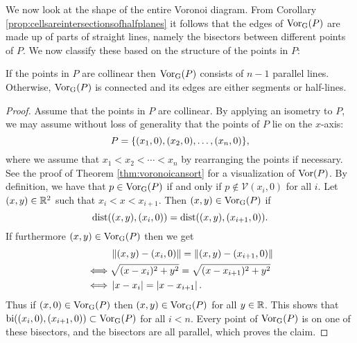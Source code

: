We now look at the shape of the entire Voronoi diagram. From Corollary \ref{prop:cellsareintersectionsofhalfplanes} it follows that the edges of $\operatorname{Vor_{G}}(P)$ are made up of parts of straight lines, namely the bisectors between different points of $P$. We now classify these based on the structure of the points in $P$:
\begin{thm} \label{prop:structureofentirevoronoidiagram}
If the points in $P$ are collinear then $\operatorname{Vor_{G}}(P)$ consists of $n - 1$ parallel lines. Otherwise, $\operatorname{Vor_{G}}(P)$ is connected and its edges are either segments or half-lines.
\end{thm}
\begin{proof}
Assume that the points in $P$ are collinear. By applying an isometry to $P$, we may assume without loss of generality that the points of $P$ lie on the $x$-axis:
\[
    P = \{(x_1, 0), (x_2, 0), \ldots, (x_n, 0)\},
\]
where we assume that $x_1 < x_2 < \cdots < x_n$ by rearranging the points if necessary. See the proof of Theorem \ref{thm:voronoicansort} for a visualization of $\operatorname{Vor}(P)$. By definition, we have that $p \in \operatorname{Vor_{G}}(P)$ if and only if $p \not\in \mathcal{V}(x_i, 0)$ for all $i$. Let $(x, y) \in \mathbb{R}^2$ such that $x_i < x < x_{i+1}$. Then $(x, y) \in \operatorname{Vor_{G}}(P)$ if
\[
    \operatorname{dist}((x, y), (x_i, 0)) = \operatorname{dist}((x, y), (x_{i+1}, 0)).
\]
If furthermore $(x, y) \in \operatorname{Vor_{G}}(P)$ then we get
\begin{align*}
    &\left\lVert (x, y) - (x_i, 0) \right\rVert = \left\lVert (x, y) - (x_{i+1}, 0) \right\rVert \\
    \iff &\sqrt{(x - x_i)^2 + y^2} = \sqrt{(x - x_{i+1})^2 + y^2} \\
    \iff &\left\lvert x - x_i \right\rvert = \left\lvert x - x_{i+1} \right\rvert.
\end{align*}
Thus if $(x, 0) \in \operatorname{Vor_{G}}(P)$ then $(x, y) \in \operatorname{Vor_{G}}(P)$ for all $y \in \mathbb{R}$. This shows that $\operatorname{bi}((x_i, 0), (x_{i+1}, 0)) \subset \operatorname{Vor_{G}}(P)$ for all $i < n$. Every point of $\operatorname{Vor_{G}}(P)$ is on one of these bisectors, and the bisectors are all parallel, which proves the claim. 


\end{proof}
